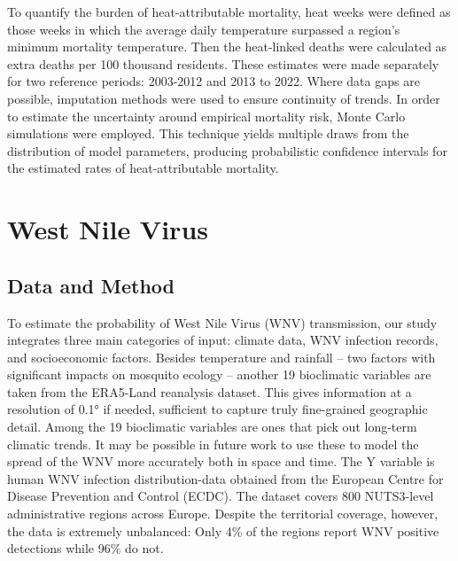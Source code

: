 \documentclass[
]{krantz}
\begin{document}
To quantify the burden of heat-attributable mortality, heat weeks were defined as those weeks in which the average daily temperature surpassed a region's minimum mortality temperature. Then the heat-linked deaths were calculated as extra deaths per 100 thousand residents. These estimates were made separately for two reference periods: 2003-2012 and 2013 to 2022. Where data gaps are possible, imputation methods were used to ensure continuity of trends. In order to estimate the uncertainty around empirical mortality risk, Monte Carlo simulations were employed. This technique yields multiple draws from the distribution of model parameters, producing probabilistic confidence intervals for the estimated rates of heat-attributable mortality.

\section{West Nile Virus}\label{west-nile-virus}

\subsection{Data and Method}\label{data-and-method}

To estimate the probability of West Nile Virus (WNV) transmission, our study integrates three main categories of input: climate data, WNV infection records, and socioeconomic factors. Besides temperature and rainfall -- two factors with significant impacts on mosquito ecology -- another 19 bioclimatic variables are taken from the ERA5-Land reanalysis dataset. This gives information at a resolution of 0.1° if needed, sufficient to capture truly fine-grained geographic detail. Among the 19 bioclimatic variables are ones that pick out long-term climatic trends. It may be possible in future work to use these to model the spread of the WNV more accurately both in space and time. The Y variable is human WNV infection distribution-data obtained from the European Centre for Disease Prevention and Control (ECDC). The dataset covers 800 NUTS3-level administrative regions across Europe. Despite the territorial coverage, however, the data is extremely unbalanced: Only 4\% of the regions report WNV positive detections while 96\% do not.
\end{document}

